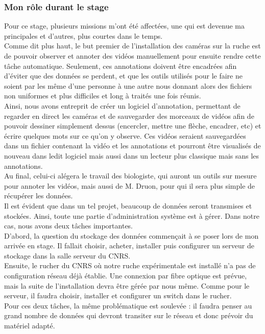 \documentclass[11pt, french]{report}
\begin{document}
\subsubsection{Mon rôle durant le stage}
Pour ce stage, plusieurs missions m'ont été affectées, une qui est devenue ma principales et d'autres, plus courtes dans le temps.\\

Comme dit plus haut, le but premier de l'installation des caméras sur la ruche est de pouvoir observer et annoter des vidéos manuellement
pour ensuite rendre cette tâche automatique. Seulement, ces annotations doivent être encadrées afin d'éviter que des données se perdent, 
et que les outils utilisés pour le faire ne soient par les même d'une personne à une autre nous donnant alors des fichiers non 
uniformes et plus difficiles et long à traités une fois réunis. \\
Ainsi, nous avons entreprit de créer un logiciel d'annotation, permettant de regarder en direct les caméras et de sauvegarder des 
morceaux de vidéos afin de pouvoir dessiner simplement dessus (encercler, mettre une flèche, encadrer, etc) et écrire quelques mots
sur ce qu'on y observe. Ces vidéos seraient sauvegardées dans un fichier contenant la vidéo et les annotations et pourront être 
visualisés de nouveau dans ledit logiciel mais aussi dans un lecteur plus classique mais sans les annotations. \\
Au final, celui-ci alégera le travail des biologiste, qui auront un outils sur mesure pour annoter les vidéos, mais aussi de M. Druon, 
pour qui il sera plus simple de récupérer les données.\\

Il est évident que dans un tel projet, beaucoup de données seront transmises et stockées. Ainsi, toute une partie d'administration 
système est à gérer. Dans notre cas, nous avons deux tâches importantes.\\
D'abord, la question du stockage des données commençait à se poser lors de mon arrivée en stage. Il fallait choisir, acheter, installer
puis configurer un serveur de stockage dans la salle serveur du CNRS.\\
Ensuite, le rucher du CNRS où notre ruche expérimentale est installé n'a pas de configuration réseau déjà établie. 
Une connexion par fibre optique est prévue, mais la suite de l'installation devra être gérée par nous même. Comme pour le serveur, 
il faudra choisir, installer et configurer un switch dans le rucher.\\
Pour ces deux tâches, la même problématique est soulevée : il faudra penser au grand nombre de données qui devront transiter sur le 
réseau et donc prévoir du matériel adapté.\\
\end{document}
